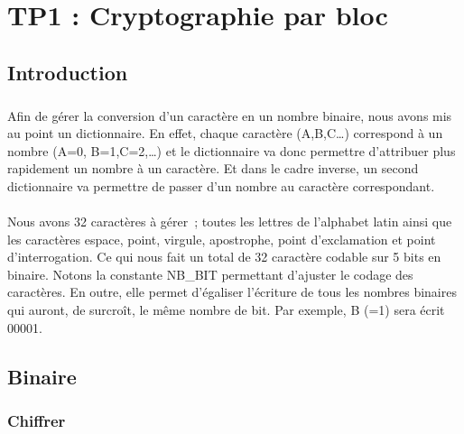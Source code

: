 \documentclass[11pt,fleqn]{book} %
\begin{document}
\chapter{TP1 : Cryptographie par bloc}



\section{Introduction}

\paragraph{}Afin de gérer la conversion d'un caractère en un nombre binaire, nous avons mis au point un dictionnaire. En effet, chaque caractère (A,B,C…) correspond à un nombre (A=0, B=1,C=2,…) et le dictionnaire va donc permettre d'attribuer plus rapidement un nombre à un caractère. Et dans le cadre inverse, un second dictionnaire va permettre de passer d'un nombre au caractère correspondant.
\\\\ Nous avons 32 caractères à gérer ; toutes les lettres de l'alphabet latin ainsi que les caractères espace, point, virgule, apostrophe, point d'exclamation et point d'interrogation. Ce qui nous fait un total de 32 caractère codable sur 5 bits en binaire. Notons la constante NB\_BIT permettant d'ajuster le codage des caractères. En outre, elle permet d’égaliser l'écriture de tous les nombres binaires qui auront, de surcroît, le même nombre de bit. Par exemple, B (=1) sera écrit 00001.

\section{Binaire}

\subsection{Chiffrer}
\end{document}
